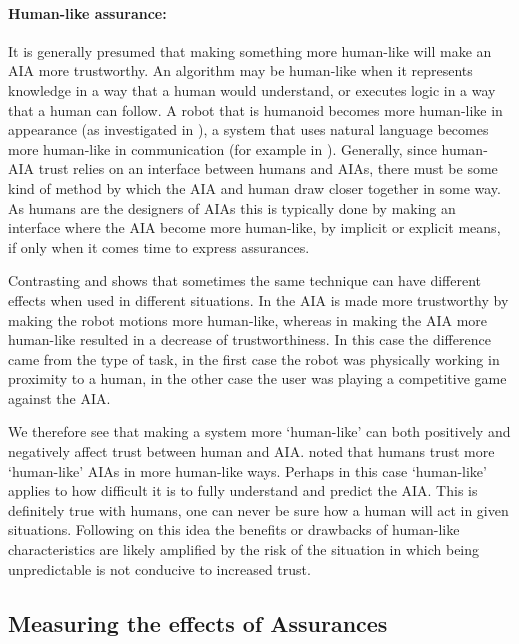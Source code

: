     \paragraph{Human-like assurance:} It is generally presumed that making something more human-like will make an AIA more trustworthy. An algorithm may be human-like when it represents knowledge in a way that a human would understand, or executes logic in a way that a human can follow. A robot that is humanoid becomes more human-like in appearance (as investigated in \cite{Bainbridge2011-pl}), a system that uses natural language becomes more human-like in communication (for example in \cite{Lacave2002-cu}). Generally, since human-AIA trust relies on an interface between humans and AIAs, there must be some kind of method by which the AIA and human draw closer together in some way. As humans are the designers of AIAs this is typically done by making an interface where the AIA become more human-like, by implicit or explicit means, if only when it comes time to express assurances.

    Contrasting \cite{Dragan2013-wd} and \cite{Wu2016-ei} shows that sometimes the same technique can have different effects when used in different situations. In \cite{Dragan2013-wd} the AIA is made more trustworthy by making the robot motions more human-like, whereas in \cite{Wu2016-ei} making the AIA more human-like resulted in a decrease of trustworthiness. In this case the difference came from the type of task, in the first case the robot was physically working in proximity to a human, in the other case the user was playing a competitive game against the AIA.

    We therefore see that making a system more `human-like' can both positively and negatively affect trust between human and AIA. 
    \citet{Tripp2011-rx} noted that humans trust more `human-like' AIAs in more human-like ways. Perhaps in this case `human-like' applies to how difficult it is to fully understand and predict the AIA. This is definitely true with humans, one can never be sure how a human will act in given situations. Following on this idea the benefits or drawbacks of human-like characteristics are likely amplified by the risk of the situation in which being unpredictable is not conducive to increased trust.

\subsection{Measuring the effects of Assurances} \label{sec:measuring_effects}

